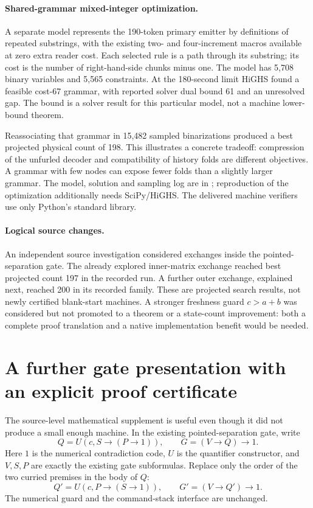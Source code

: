 \documentclass[10pt,letterpaper]{article}
\newcommand{\file}[1]{\path{#1}}
\begin{document}
\paragraph{Shared-grammar mixed-integer optimization.}
A separate model represents the 190-token primary emitter by definitions
of repeated substrings, with the existing two- and four-increment macros
available at zero extra reader cost. Each selected rule is a path through
its substring; its cost is the number of right-hand-side chunks minus one.
The model has 5,708 binary variables and 5,565 constraints. At the
180-second limit HiGHS found a feasible cost-67 grammar, with reported
solver dual bound 61 and an unresolved gap. The bound is a solver result
for this particular model, not a machine lower-bound theorem.

Reassociating that grammar in 15,482 sampled binarizations produced a best
projected physical count of 198. This illustrates a concrete tradeoff:
compression of the unfurled decoder and compatibility of history folds
are different objectives. A grammar with few nodes can expose fewer folds
than a slightly larger grammar. The model, solution and sampling log are
in \file{research/grammar/}; reproduction of the optimization additionally
needs SciPy/HiGHS. The delivered machine verifiers use only Python's
standard library.

\paragraph{Logical source changes.}
An independent source investigation considered exchanges inside the
pointed-separation gate. The already explored inner-matrix exchange reached
best projected count 197 in the recorded run. A further outer exchange,
explained next, reached 200 in its recorded family. These are projected
search results, not newly certified blank-start machines. A stronger
freshness guard $c>a+b$ was considered but not promoted to a theorem or a
state-count improvement: both a complete proof translation and a native
implementation benefit would be needed.

\section{A further gate presentation with an explicit proof certificate}
\label{sec:gate}

The source-level mathematical supplement is useful even though it did not
produce a small enough machine. In the existing pointed-separation gate,
write
\[
 Q=U(c,S\to(P\to 1)),\qquad
 G=(V\to Q)\to 1.
\]
Here $1$ is the numerical contradiction code, $U$ is the quantifier
constructor, and $V,S,P$ are exactly the existing gate subformulas.
Replace only the order of the two curried premises in the body of $Q$:
\[
 Q'=U(c,P\to(S\to 1)),\qquad G'=(V\to Q')\to 1.
\]
The numerical guard and the command-stack interface are unchanged.
\end{document}
